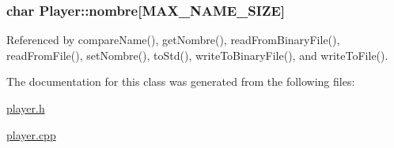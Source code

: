 \hypertarget{class_player_ab95c5a516b98e3598501ae98a0ff7cbc}{}
\subsubsection[{nombre}]{\setlength{\rightskip}{0pt plus 5cm}char Player\+::nombre\mbox{[}{\bf M\+A\+X\+\_\+\+N\+A\+M\+E\+\_\+\+S\+I\+Z\+E}\mbox{]}\hspace{0.3cm}{\ttfamily [private]}}\label{class_player_ab95c5a516b98e3598501ae98a0ff7cbc}


Referenced by compare\+Name(), get\+Nombre(), read\+From\+Binary\+File(), read\+From\+File(), set\+Nombre(), to\+Std(), write\+To\+Binary\+File(), and write\+To\+File().



The documentation for this class was generated from the following files\+:\begin{DoxyCompactItemize}
\item 
\hyperlink{player_8h}{player.\+h}\item 
\hyperlink{player_8cpp}{player.\+cpp}\end{DoxyCompactItemize}
